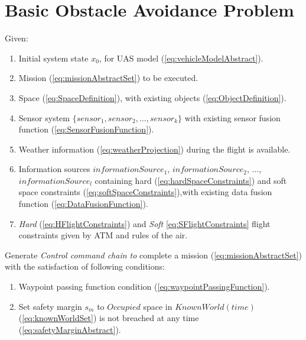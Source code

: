 \section{Basic Obstacle Avoidance Problem}\label{s:BasicProblemDefinition}
    \noindent Given:

    \begin{enumerate}
        \item Initial system state $x_0$, for UAS model (\ref{eq:vehicleModelAbstract}).
        
        \item Mission (\ref{eq:missionAbstractSet}) to be executed.
        
        \item Space (\ref{eq:SpaceDefinition}), with existing objects (\ref{eq:ObjectDefinition}).
        
        \item Sensor system $\{sensor_1, sensor_2,\dots,sensor_k\}$ with existing sensor fusion function (\ref{eq:SensorFusionFunction}).
        
        \item Weather information (\ref{eq:weatherProjection}) during the flight is available.
        
        \item Information sources $informationSource_1$, $informationSource_2$, $\dots$, $informationSource_l$ containing hard (\ref{eq:hardSpaceConstraints}) and soft space constraints (\ref{eq:softSpaceConstraints}),with existing data fusion function (\ref{eq:DataFusionFunction}).
        
        \item \emph{Hard} (\ref{eq:HFlightConstraints}) and \emph{Soft} \ref{eq:SFlightConstraints} flight constraints given by ATM and rules of the air. 
    \end{enumerate}

    \noindent Generate \emph{Control command chain to} complete a mission (\ref{eq:missionAbstractSet}) with the satisfaction of following conditions:
    
    \begin{enumerate}
        \item Waypoint passing function condition (\ref{eq:waypointPassingFunction}).
        
        \item Set safety margin $s_m$ to $Occupied$  space in $KnownWorld(time)$ (\ref{eq:knownWorldSet}) is not breached at any time (\ref{eq:safetyMarginAbstract}).
    \end{enumerate}
